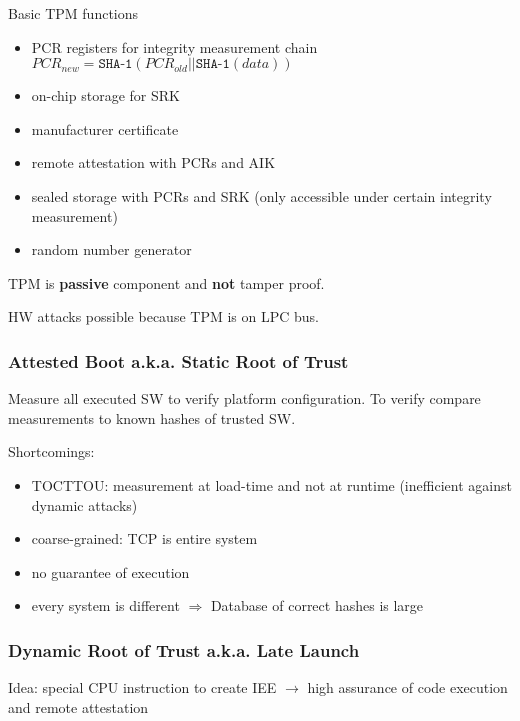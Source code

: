 Basic TPM functions
\begin{itemize}
    \item PCR registers for integrity measurement chain $PCR_{new} = \texttt{SHA-1}(PCR_{old}|| \texttt{SHA-1}(data))$
    \item on-chip storage for SRK
    \item manufacturer certificate
    \item remote attestation with PCRs and AIK
    \item sealed storage with PCRs and SRK (only accessible under certain integrity measurement)
    \item random number generator
\end{itemize}
TPM is \textbf{passive} component and \textbf{not} tamper proof.

HW attacks possible because TPM is on LPC bus.

\subsubsection{Attested Boot a.k.a. Static Root of Trust}
Measure all executed SW to verify platform configuration. To verify compare measurements to known hashes of trusted SW.

Shortcomings:

\begin{itemize}
    \item TOCTTOU: measurement at load-time and not at runtime (inefficient against dynamic attacks)
    \item coarse-grained: TCP is entire system
    \item no guarantee of execution
    \item every system is different $\Rightarrow$ Database of correct hashes is
      large
\end{itemize}

\subsubsection{Dynamic Root of Trust a.k.a. Late Launch}
Idea: special CPU instruction to create IEE $\xrightarrow{}$ high assurance of code execution and remote attestation

